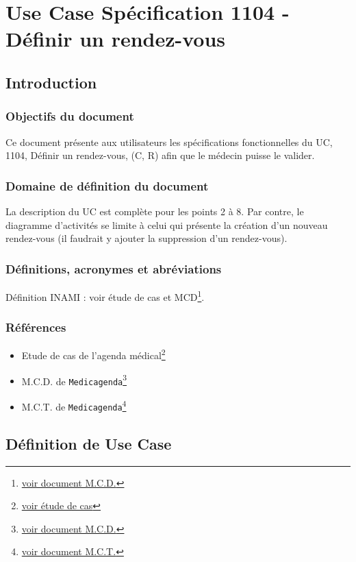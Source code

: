 \chapter{Use Case Spécification 1104 - Définir un rendez-vous}

\section{Introduction}

\subsection{Objectifs du document}
Ce document présente aux utilisateurs les spécifications fonctionnelles du UC,
1104, Définir un rendez-vous, (C, R) afin que le médecin puisse le valider.

\subsection{Domaine de définition du document}
La description du UC est complète pour les points 2 à 8. Par contre, le
diagramme d’activités se limite à celui qui présente la création d’un nouveau 
rendez-vous (il faudrait y ajouter la suppression d’un rendez-vous). 

\subsection{Définitions, acronymes et abréviations}
Définition INAMI : voir étude de cas et MCD\footnote{\href{../MCD/MCD.pdf}{voir document M.C.D.}}.

\subsection{Références}
\begin{itemize}
	\item[] Etude de cas de l'agenda
		médical\footnote{\href{../Enonce_Travail_Synthese_14-15.pdf}{voir
		étude de cas}}
	\item[] M.C.D. de \texttt{Medicagenda}\footnote{\href{../MCD/MCD.pdf}{voir document M.C.D.}}
	\item[] M.C.T. de \texttt{Medicagenda}\footnote{\href{./MCT.pdf}{voir document M.C.T.}}
\end{itemize}
\newpage

\section{Définition de Use Case}
